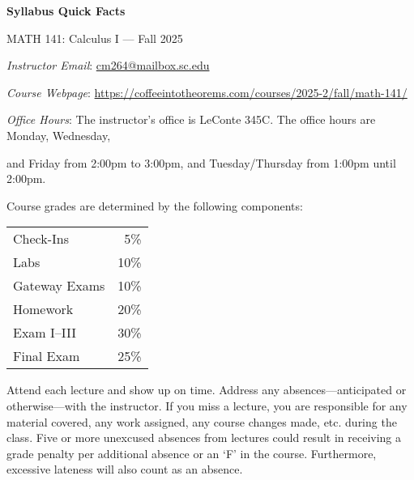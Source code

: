 \documentclass[11pt,letterpaper]{article}
\begin{document}
\begin{center} 
\bfseries
\color{scred}
\LARGE Syllabus Quick Facts \par\vspace{0.2\baselineskip}
\Large MATH 141: Calculus I --- Fall 2025
\end{center} \pspace


\hspace{0.53cm} {\itshape Instructor Email}: \href{mailto:cm264@mailbox.sc.edu}{cm264@mailbox.sc.edu} \par
\hspace{0.53cm} {\itshape Course Webpage}: \href{https://coffeeintotheorems.com/courses/2025-2/fall/math-141/}{https://coffeeintotheorems.com/courses/2025-2/fall/math-141/} \par
\hspace{0.53cm} {\itshape Office Hours}: The instructor's office is LeConte 345C. The office hours are Monday, Wednesday, \par \hspace{0.55cm} and Friday from 2:00pm to 3:00pm, and Tuesday/Thursday from 1:00pm until 2:00pm. \pspace


Course grades are determined by the following components: \par \vspace{-0.3cm}
	\begin{table}[!ht]
        \begin{tabular}{lr}
	Check-Ins & 5\% \\
	Labs & 10\% \\
	Gateway Exams & 10\% \\
	Homework & 20\% \\
	Exam I--III & 30\% \\
	Final Exam & 25\%
        \end{tabular} 
        \end{table}


Attend each lecture and show up on time. Address any absences---anticipated or otherwise---with the instructor. If you miss a lecture, you are responsible for any material covered, any work assigned, any course changes made, etc. during the class. Five or more unexcused absences from lectures could result in receiving a grade penalty per additional absence or an `F' in the course. Furthermore, excessive lateness will also count as an absence. 
\pspace
\end{document}
